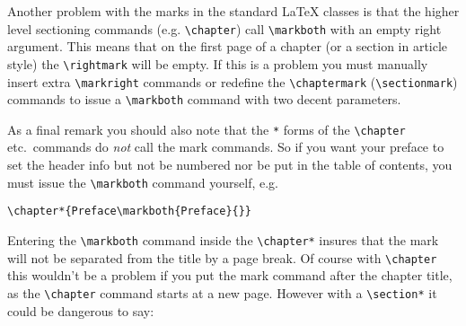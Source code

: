 \documentclass{article}
\def\latex/{\protect\LaTeX{}}
\begin{document}
Another problem with the marks in the standard \latex/ classes is that the
higher level sectioning commands (e.g. \verb|\chapter|) call
\verb|\markboth| with an empty right argument. This means that on the first
page of a chapter (or a section in article style) the \verb|\rightmark|
will be empty. If this is a problem you must manually insert extra
\verb|\markright| commands or redefine the \verb|\chaptermark|
(\verb|\sectionmark|) commands to issue a \verb|\markboth| command with
two decent parameters.

As a final remark you should also note that the \verb|*| forms of the
\verb|\chapter| etc.\ commands do \emph{not} call the mark commands. So if
you want your preface to set the header info but not be numbered nor be put in
the table of contents, you must issue the \verb|\markboth| command
yourself, e.g.

\begin{verbatim}
\chapter*{Preface\markboth{Preface}{}}
\end{verbatim}

Entering the \verb|\markboth| command inside the \verb|\chapter*| insures
that the mark will not be separated from the title by a page break. Of
course with \verb|\chapter| this wouldn't be  a problem if you put the mark
command after the chapter title, as the \verb|\chapter| command starts at a
new page. However with a \verb|\section*| it could be dangerous to say:
\end{document}
